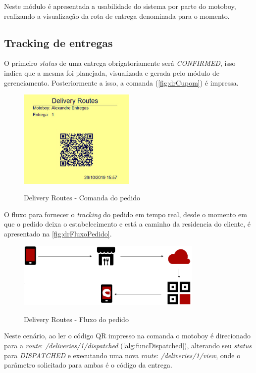 Neste módulo é apresentada a usabilidade do sistema por parte do motoboy, realizando a visualização da rota de entrega denominada para o momento.

\subsection{Tracking de entregas}
O primeiro \textit{status} de uma entrega obrigatoriamente será \textit{CONFIRMED}, isso indica que a mesma foi planejada, visualizada e gerada pelo módulo de gerenciamento. Posteriormente a isso, a comanda (\autoref{fig:drCupom}) é impressa.

 \begin{figure}[H]
    \centering
    \caption{Delivery Routes - Comanda do pedido}
    \includegraphics[width=0.5\textwidth]{./dados/figuras/fig24}
    \label{fig:drCupom}
\end{figure}

O fluxo para fornecer o \textit{tracking} do pedido em tempo real, desde o momento em que o pedido deixa o estabelecimento e está a caminho da residencia do cliente, é apresentado na \autoref{fig:drFluxoPedido}.

\begin{figure}[H]
    \centering
    \caption{Delivery Routes - Fluxo do pedido}
    \includegraphics[width=0.8\textwidth]{./dados/figuras/fig25}
    \label{fig:drFluxoPedido}
\end{figure}

Neste cenário, ao ler o código QR impresso na comanda o motoboy é direcionado para a \textit{route}: \textit{/deliveries/1/dispatched} (\autoref{alg:funcDispatched}), alterando seu \textit{status} para \textit{DISPATCHED} e executando uma nova \textit{route}: \textit{/deliveries/1/view}, onde o parâmetro solicitado para ambas é o código da entrega.

